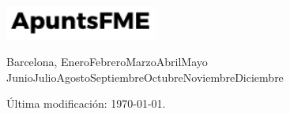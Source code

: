 \begin{titlepage}
    \vspace{1\baselineskip} %


    \vspace{2\baselineskip} %


    \vfill %


    \includegraphics[width=5cm]{../logo.pdf}

    \vspace{0.3\baselineskip} %
     
    Barcelona, {\ifcase \month \or Enero\or Febrero\or Marzo\or Abril\or Mayo \or Junio\or Julio\or Agosto\or Septiembre\or Octubre\or Noviembre\or Diciembre\fi \:  \number \year} %



\end{titlepage}

\vspace*{\fill}


\quad


\quad


\quad


\quad

\noindent Última modificación: \today.

\doclicenseThis
